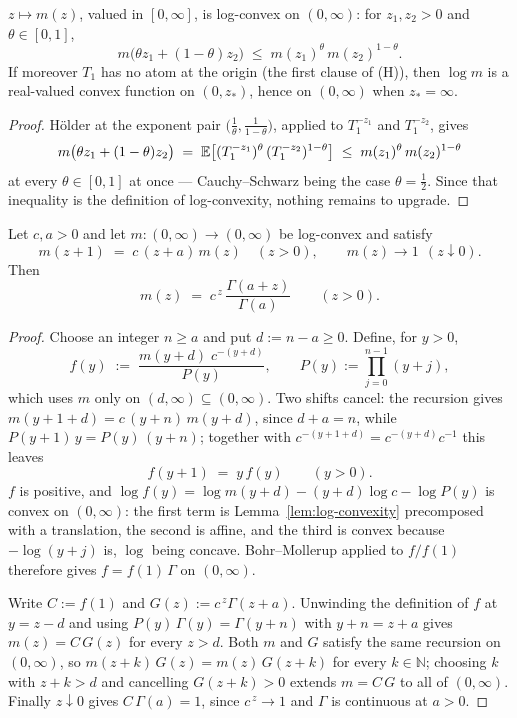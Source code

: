 \begin{lemma}\label{lem:log-convexity}
$z \mapsto m(z)$, valued in $[0,\infty]$, is log-convex on $(0, \infty)$: for $z_1, z_2 > 0$ and
$\theta \in [0,1]$,
\[
  m\bigl(\theta z_1 + (1-\theta) z_2\bigr) \;\le\; m(z_1)^{\theta}\,m(z_2)^{1-\theta} .
\]
If moreover $T_1$ has no atom at the origin (the first clause of (H)), then $\log m$ is a
real-valued convex function on $(0, z_*)$, hence on $(0,\infty)$ when $z_* = \infty$.
\end{lemma}

\begin{proof}
H\"older at the exponent pair $\bigl(\tfrac1\theta, \tfrac1{1-\theta}\bigr)$, applied to
$T_1^{-z_1}$ and $T_1^{-z_2}$, gives
\[
  m\bigl(\theta z_1 + (1-\theta) z_2\bigr)
    \;=\; \mathbb{E}\bigl[(T_1^{-z_1})^{\theta}\,(T_1^{-z_2})^{1-\theta}\bigr]
    \;\le\; m(z_1)^{\theta}\,m(z_2)^{1-\theta}
\]
at every $\theta \in [0,1]$ at once --- Cauchy--Schwarz being the case $\theta = \tfrac12$.
Since that inequality is the definition of log-convexity, nothing remains to upgrade.
\end{proof}

\begin{lemma}
\label{lem:gamma-recursion-uniqueness}
Let $c, a > 0$ and let $m : (0,\infty) \to (0,\infty)$ be log-convex and satisfy
\[
  m(z+1) \;=\; c\,(z + a)\,m(z) \quad (z > 0),
  \qquad m(z) \to 1 \ \ (z \downarrow 0).
\]
Then
\[
  m(z) \;=\; c^{\,z}\,\frac{\Gamma(a + z)}{\Gamma(a)} \qquad (z > 0).
\]
\end{lemma}

\begin{proof}
Choose an integer $n \ge a$ and put $d := n - a \ge 0$. Define, for $y > 0$,
\[
  f(y) \;:=\; \frac{m(y + d)\; c^{-(y+d)}}{P(y)},
  \qquad P(y) := \prod_{j=0}^{n-1}(y + j),
\]
which uses $m$ only on $(d, \infty) \subseteq (0,\infty)$. Two shifts cancel: the recursion
gives $m(y + 1 + d) = c\,(y + n)\,m(y+d)$, since $d + a = n$, while
$P(y+1)\,y = P(y)\,(y+n)$; together with $c^{-(y+1+d)} = c^{-(y+d)}c^{-1}$ this leaves
\[
  f(y+1) \;=\; y\,f(y) \qquad (y > 0).
\]
$f$ is positive, and $\log f(y) = \log m(y+d) - (y+d)\log c - \log P(y)$ is convex on
$(0,\infty)$: the first term is Lemma~\ref{lem:log-convexity} precomposed with a translation,
the second is affine, and the third is convex because $-\log(y+j)$ is, $\log$ being concave.
Bohr--Mollerup applied to $f/f(1)$ therefore gives $f = f(1)\,\Gamma$ on $(0,\infty)$.

Write $C := f(1)$ and $G(z) := c^{\,z}\Gamma(z+a)$. Unwinding the definition of $f$ at
$y = z - d$ and using $P(y)\,\Gamma(y) = \Gamma(y+n)$ with $y + n = z + a$ gives
$m(z) = C\,G(z)$ for every $z > d$. Both $m$ and $G$ satisfy the same recursion on
$(0,\infty)$, so $m(z + k)\,G(z) = m(z)\,G(z+k)$ for every $k \in \mathbb{N}$; choosing $k$
with $z + k > d$ and cancelling $G(z+k) > 0$ extends $m = C\,G$ to all of $(0,\infty)$.
Finally $z \downarrow 0$ gives $C\,\Gamma(a) = 1$, since $c^{\,z} \to 1$ and $\Gamma$ is
continuous at $a > 0$.
\end{proof}

